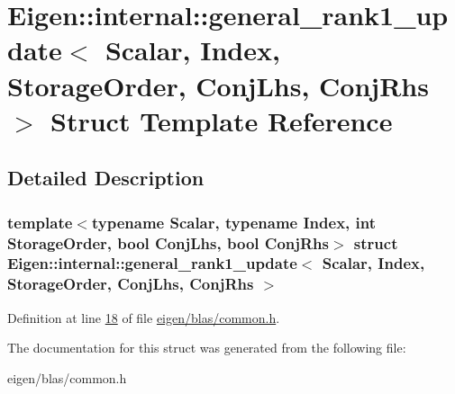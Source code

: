 \hypertarget{struct_eigen_1_1internal_1_1general__rank1__update}{}\section{Eigen\+:\+:internal\+:\+:general\+\_\+rank1\+\_\+update$<$ Scalar, Index, Storage\+Order, Conj\+Lhs, Conj\+Rhs $>$ Struct Template Reference}
\label{struct_eigen_1_1internal_1_1general__rank1__update}


\subsection{Detailed Description}
\subsubsection*{template$<$typename Scalar, typename Index, int Storage\+Order, bool Conj\+Lhs, bool Conj\+Rhs$>$\newline
struct Eigen\+::internal\+::general\+\_\+rank1\+\_\+update$<$ Scalar, Index, Storage\+Order, Conj\+Lhs, Conj\+Rhs $>$}



Definition at line \hyperlink{eigen_2blas_2common_8h_source_l00018}{18} of file \hyperlink{eigen_2blas_2common_8h_source}{eigen/blas/common.\+h}.



The documentation for this struct was generated from the following file\+:\begin{DoxyCompactItemize}
\item 
eigen/blas/common.\+h\end{DoxyCompactItemize}
